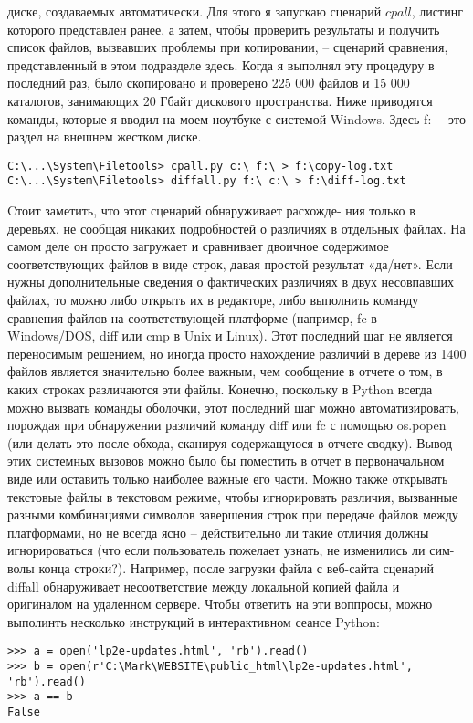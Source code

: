 \documentclass[12pt]{article}
\begin{document}
диске, создаваемых автоматически. Для этого я запускаю сценарий
$cpall$, листинг которого представлен ранее, а затем,
чтобы проверить результаты и получить список файлов, вызвавших
проблемы при копировании, – сценарий сравнения, представленный в этом подразделе
здесь. Когда я выполнял эту процедуру в последний раз, было скопировано и проверено 225 000 файлов и 15 000 каталогов, занимающих
20 Гбайт дискового пространства.
Ниже приводятся команды, которые я вводил на моем
ноутбуке с сис­темой Windows. Здесь f:\ – это раздел на внешнем жестком диске.
\begin{verbatim}
C:\...\System\Filetools> cpall.py c:\ f:\ > f:\copy-log.txt
C:\...\System\Filetools> diffall.py f:\ c:\ > f:\diff-log.txt
\end{verbatim}
Cтоит заметить, что этот сценарий обнаруживает расхожде-
ния только в деревьях, не сообщая никаких подробностей о различиях
в отдельных файлах. На самом деле он просто загружает и сравнивает двоичное содержимое соответствующих файлов в виде строк, давая
простой результат «да/нет».
Если нужны дополнительные сведения о фактических различиях в двух несовпавших файлах, то можно либо открыть их в редакторе, либо
выполнить команду сравнения файлов на соответствующей платформе
(например, fc в Windows/DOS, diff или cmp в Unix и Linux). Этот последний шаг не является переносимым решением, но иногда просто нахождение различий в дереве из 1400 файлов является
значительно более важным, чем сообщение в отчете о том, в каких строках различаются эти файлы.
Конечно, поскольку в Python всегда можно вызвать команды оболочки,
этот последний шаг можно автоматизировать, порождая при обнаружении различий команду diff или fc с помощью os.popen (или делать
это после обхода, сканируя содержащуюся в отчете сводку). Вывод этих
сис­темных вызовов можно было бы поместить в отчет в первоначальном
виде или оставить только наиболее важные его части.
Можно также открывать текстовые файлы в текстовом режиме,
чтобы игнорировать различия, вызванные разными комбинациями
символов завершения строк при передаче файлов между платформами,
но не всегда ясно – действительно ли такие отличия должны игнорироваться (что если пользователь пожелает узнать, не изменились ли сим-
волы конца строки?). Например, после загрузки файла с веб-сайта сценарий
diffall обнаруживает несоответствие между локальной копией файла
и оригиналом на удаленном сервере. Чтобы ответить на эти воппросы, можно выполинть несколько инструкций в интерактивном сеансе Python:
\begin{verbatim}
>>> a = open('lp2e-updates.html', 'rb').read()
>>> b = open(r'C:\Mark\WEBSITE\public_html\lp2e-updates.html', 'rb').read()
>>> a == b
False
\end{verbatim}
\end{document}
